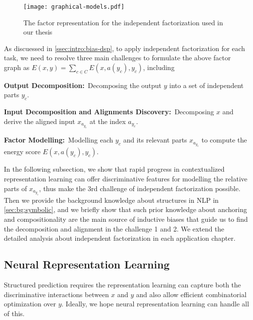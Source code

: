 \begin{figure}[!th]
\centering
\texttt{[image: graphical-models.pdf]}
\caption{\label{fig:bg:graphical-model}The factor representation for
  the independent factorization used in our thesis}
\end{figure}

As discuessed in \autoref{ssec:intro:bias-dsp}, to apply independent
factorization for each task, we need to resolve three main challenges
to formulate the above factor graph as
$E(x, y) = \sum_{c \in C}E(x, a(y_{c}), y_{c})$, including
\begin{inparaenum}[(1)]
\item \textbf{Output Decomposition:}~Decomposing the output $y$ into a set of independent parts
  $y_{c}$.
\item \textbf{Input Decomposition and Alignments Discovery:}~Decomposing $x$ and derive the aligned input $x_{a_{y_{c}}}$ at
  the index $a_{y_{c}}$.
\item \textbf{Factor Modelling:}~Modelling each $y_{c}$ and its
  relevant parts $x_{a_{y_{c}}}$ to compute the energy score
  $E(x, a(y_{c}), y_{c})$.
\end{inparaenum}

In the following subsection, we show that rapid progress in
contextualized representation learning can offer discriminative
features for modelling the relative parts of $x_{a_{y_{c}}}$, thus
make the 3rd challenge of independent factorization possible. Then we
provide the background knowledge about structures in NLP in
\autoref{sec:bg:symbolic}, and we briefly show that such prior
knowledge about anchoring and compositionality are the main source of
inductive biases that guide us to find the decomposition and alignment
in the challenge 1 and 2. We extend the detailed analysis about
independent factorization in each application chapter.

\subsection{Neural Representation Learning}
\label{ssec:bg:rep-learning}

Structured prediction requires the representation learning can capture
both the discriminative interactions between $x$ and $y$ and also
allow efficient combinatorial optimization over $y$. Ideally, we hope
neural representation learning can handle all of this.


